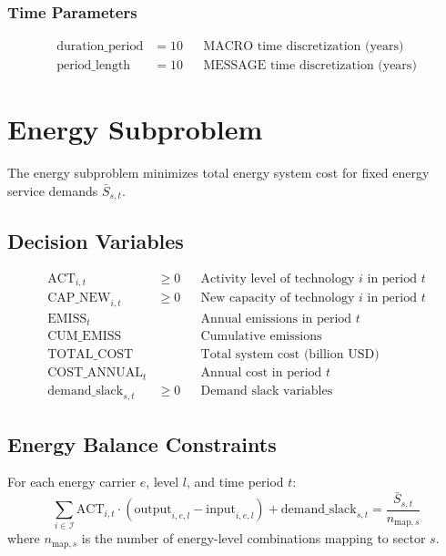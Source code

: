 \documentclass[11pt]{article}
\begin{document}
\subsubsection{Time Parameters}
\begin{align}
\text{duration\_period} &= 10 && \text{MACRO time discretization (years)} \\
\text{period\_length} &= 10 && \text{MESSAGE time discretization (years)}
\end{align}

\section{Energy Subproblem}

The energy subproblem minimizes total energy system cost for fixed energy service demands $\bar{S}_{s,t}$.

\subsection{Decision Variables}
\begin{align}
\text{ACT}_{i,t} &\geq 0 && \text{Activity level of technology } i \text{ in period } t \\
\text{CAP\_NEW}_{i,t} &\geq 0 && \text{New capacity of technology } i \text{ in period } t \\
\text{EMISS}_t &\quad && \text{Annual emissions in period } t \\
\text{CUM\_EMISS} &\quad && \text{Cumulative emissions} \\
\text{TOTAL\_COST} &\quad && \text{Total system cost (billion USD)} \\
\text{COST\_ANNUAL}_t &\quad && \text{Annual cost in period } t \\
\text{demand\_slack}_{s,t} &\geq 0 && \text{Demand slack variables}
\end{align}

\subsection{Energy Balance Constraints}
For each energy carrier $e$, level $l$, and time period $t$:
\begin{equation}
\sum_{i \in \mathcal{I}} \text{ACT}_{i,t} \cdot (\text{output}_{i,e,l} - \text{input}_{i,e,l}) + \text{demand\_slack}_{s,t} = \frac{\bar{S}_{s,t}}{n_{\text{map},s}}
\end{equation}
where $n_{\text{map},s}$ is the number of energy-level combinations mapping to sector $s$.
\end{document}
